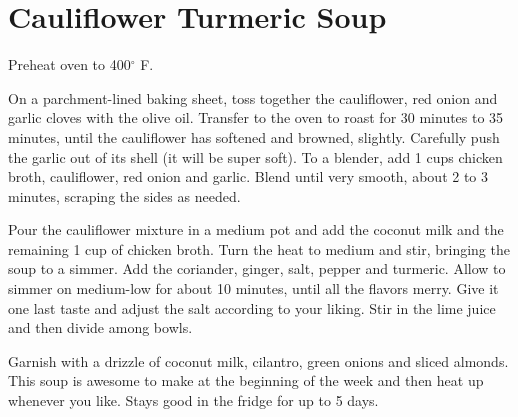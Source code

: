 \section{Cauliflower Turmeric Soup}
\begin{recipe}



    Preheat oven to 400$^{\circ}$ F.

    On a parchment-lined baking sheet, toss together the cauliflower, red onion and garlic cloves with the olive oil. Transfer to the oven to roast for 30 minutes to 35 minutes, until the cauliflower has softened and browned, slightly. Carefully push the garlic out of its shell (it will be super soft). To a blender, add 1  cups chicken broth, cauliflower, red onion and garlic. Blend until very smooth, about 2 to 3 minutes, scraping the sides as needed.

	Pour the cauliflower mixture in a medium pot and add the coconut milk and the remaining 1 cup of chicken broth. Turn the heat to medium and stir, bringing the soup to a simmer. Add the coriander, ginger, salt, pepper and turmeric. Allow to simmer on medium-low for about 10 minutes, until all the flavors merry. Give it one last taste and adjust the salt according to your liking. Stir in the lime juice and then divide among bowls.

	Garnish with a drizzle of coconut milk, cilantro, green onions and sliced almonds. This soup is awesome to make at the beginning of the week and then heat up whenever you like. Stays good in the fridge for up to 5 days.

\end{recipe}
